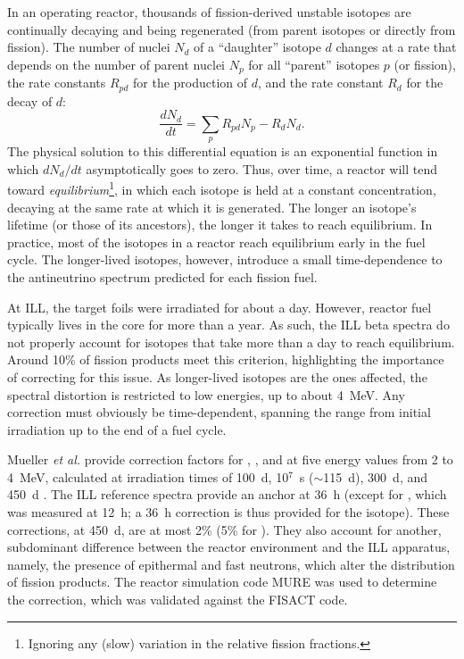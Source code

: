 \documentclass[../thesis.tex]{subfiles}
\begin{document}
In an operating reactor, thousands of fission-derived unstable isotopes are continually decaying and being regenerated (from parent isotopes or directly from fission). The number of nuclei $N_d$ of a ``daughter'' isotope $d$ changes at a rate that depends on the number of parent nuclei $N_p$ for all ``parent'' isotopes $p$ (or fission), the rate constants $R_{pd}$ for the production of $d$, and the rate constant $R_d$ for the decay of $d$:
\begin{equation}
  \frac{dN_d}{dt} = \sum_p R_{pd} N_p - R_d N_d.
\end{equation}
The physical solution to this differential equation is an exponential function in which $dN_d/dt$ asymptotically goes to zero. Thus, over time, a reactor will tend toward \emph{equilibrium}\footnote{Ignoring any (slow) variation in the relative fission fractions.}, in which each isotope is held at a constant concentration, decaying at the same rate at which it is generated. The longer an isotope's lifetime (or those of its ancestors), the longer it takes to reach equilibrium. In practice, most of the isotopes in a reactor reach equilibrium early in the fuel cycle. The longer-lived isotopes, however, introduce a small time-dependence to the antineutrino spectrum predicted for each fission fuel.

At ILL, the target foils were irradiated for about a day. However, reactor fuel typically lives in the core for more than a year. As such, the ILL beta spectra do not properly account for isotopes that take more than a day to reach equilibrium. Around 10\% of fission products meet this criterion, highlighting the importance of correcting for this issue. As longer-lived isotopes are the ones affected, the spectral distortion is restricted to low energies, up to about 4~MeV. Any correction must obviously be time-dependent, spanning the range from initial irradiation up to the end of a fuel cycle.

Mueller \emph{et al.} provide correction factors for \urfive, \punine, and \puone at five energy values from 2 to 4~MeV, calculated at irradiation times of 100~d, 10$^7$~s ($\sim$115~d), 300~d, and 450~d \cite{PhysRevC.83.054615}. The ILL reference spectra provide an anchor at 36~h (except for \urfive, which was measured at 12~h; a 36~h correction is thus provided for the isotope). These corrections, at 450~d, are at most 2\% (5\% for \urfive). They also account for another, subdominant difference between the reactor environment and the ILL apparatus, namely, the presence of epithermal and fast neutrons, which alter the distribution of fission products. The reactor simulation code MURE was used to determine the correction, which was validated against the FISACT code.
\end{document}
